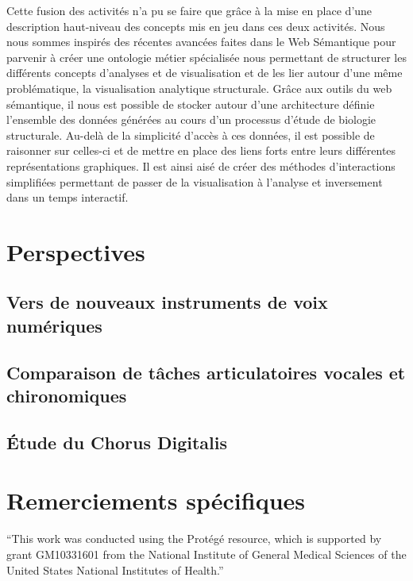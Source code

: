 Cette fusion des activités n'a pu se faire que grâce à la mise en place d'une description haut-niveau des concepts mis en jeu dans ces deux activités. Nous nous sommes inspirés des récentes avancées faites dans le Web Sémantique pour parvenir à créer une ontologie métier spécialisée nous permettant de structurer les différents concepts d'analyses et de visualisation et de les lier autour d'une même problématique, la visualisation analytique structurale. 
Grâce aux outils du web sémantique, il nous est possible de stocker autour d'une architecture définie l'ensemble des données générées au cours d'un processus d'étude de biologie structurale. Au-delà de la simplicité d'accès à ces données, il est possible de raisonner sur celles-ci et de mettre en place des liens forts entre leurs différentes représentations graphiques. Il est ainsi aisé de créer des méthodes d'interactions simplifiées permettant de passer de la visualisation à l'analyse et inversement dans un temps interactif.


\section*{Perspectives}

\subsection*{Vers de nouveaux instruments de voix numériques}
\lipsum[1-2]

\subsection*{Comparaison de tâches articulatoires vocales et chironomiques}
\lipsum[1-2]

\subsection*{Étude du Chorus Digitalis}
\lipsum[1-2]

\section*{Remerciements spécifiques}

“This work was conducted using the Protégé resource, which is supported by grant GM10331601 from the National Institute of General Medical Sciences of the United States National Institutes of Health.” 
